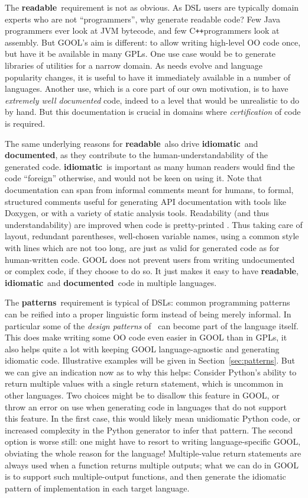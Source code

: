 \documentclass[sigplan,review,anonymous,prologue,dvipsnames]{acmart}
\newcommand{\Cplusplus}{C\texttt{++}}
\newcommand{\abbrev}[1]{\textbf{#1}}
\newcommand{\readable}{\abbrev{readable}}
\newcommand{\idiomatic}{\abbrev{idiomatic}}
\newcommand{\documented}{\abbrev{documented}}
\newcommand{\oopatterns}{\abbrev{patterns}}
\begin{document}
The \readable~requirement is not as obvious. As DSL users are typically
domain experts who are not ``programmers'', why generate readable code?
Few Java programmers ever look at JVM bytecode, and few \Cplusplus programmers
look at assembly. But GOOL's aim is different: to allow writing
high-level OO code once, but have it be available in many GPLs. One use case
would be to generate libraries of utilities for a narrow domain. As needs
evolve and language popularity changes, it is useful to have it immediately
available in a number of languages. Another use, which is a core part of our
own motivation, is to have \emph{extremely well documented} code, indeed to
a level that would be unrealistic to do by hand. But this documentation is
crucial in domains where \emph{certification} of code is required.

The same underlying reasons for \readable~also drive \idiomatic~and \documented,
as they contribute to the human-understandability of the generated code.
\idiomatic~is important as many human readers would find the code ``foreign''
otherwise, and would not be keen on using it.
Note that documentation can span from informal comments meant for humans, to
formal, structured comments useful for generating API documentation with tools
like Doxygen, or with a variety of static analysis tools.
Readability (and thus understandability) are improved when code is pretty-printed%
\cite{buse2009learning}. Thus taking care of layout, redundant parentheses,
well-chosen variable names, using a common style with lines which are not too
long, are just as valid for generated code as for human-written code.
GOOL does not prevent users from writing undocumented or complex code, if they
choose to do so. It just makes it easy to have \readable, \idiomatic~and
\documented~code in multiple languages.

The \oopatterns~requirement is typical of DSLs: common programming patterns
can be reified into a proper linguistic form instead of being merely
informal. In particular some of the \emph{design patterns} of~\cite{gamma1995design}
can become part of the language itself. This does make writing some OO
code even easier in GOOL than in GPLs, it also helps quite a lot with
keeping GOOL language-agnostic and generating idiomatic code. Illustrative
examples will be given in Section~\ref{sec:patterns}.  But we can give an
indication now as to why this helps: Consider Python's
ability to return multiple values with a single return statement, which
is uncommon in other languages.  Two choices might be to disallow this
feature in GOOL, or throw an error on use when generating code in languages
that do not support this feature. In the first case, this would likely mean
unidiomatic Python code, or increased complexity in the Python generator to
infer that pattern. The second option is worse still: one might have to resort
to writing language-specific GOOL, obviating the whole reason for the language!
Multiple-value return statements are always used when a function returns multiple
outputs; what we can do in GOOL is to support such multiple-output functions,
and
then generate the idiomatic pattern of implementation in each target language.
\end{document}
